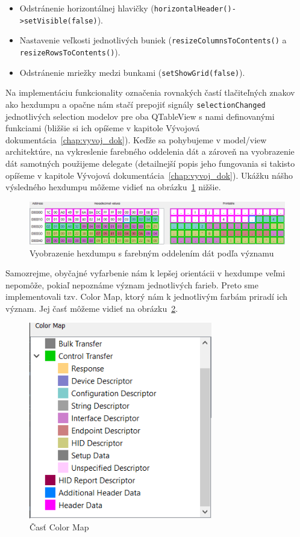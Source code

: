 \begin{itemize}
\item Odstránenie horizontálnej hlavičky (\texttt{horizontalHeader()->setVisible(false)}).
\item Nastavenie veľkosti jednotlivých buniek (\texttt{resizeColumnsToContents()} a \texttt{resizeRowsToContents()}).
\item Odstránenie mriežky medzi bunkami (\texttt{setShowGrid(false)}).
\end{itemize}

Na implementáciu funkcionality označenia rovnakých častí tlačiteľných znakov ako hexdumpu a opačne nám stačí prepojiť signály \texttt{selectionChanged} jednotlivých selection modelov pre oba QTableView s nami definovanými funkciami (bližšie si ich opíšeme v kapitole Vývojová dokumentácia~\ref{chap:vyvoj_dok}). Keďže sa pohybujeme v model/view architektúre, na vykreslenie farebného oddelenia dát a zároveň na vyobrazenie dát samotných použijeme delegate (detailnejší popis jeho fungovania si takisto opíšeme v kapitole Vývojová dokumentácia~\ref{chap:vyvoj_dok}). Ukážku nášho výsledného hexdumpu môžeme vidieť na obrázku~\ref{obr:kap3:hexdump_color} nižšie.

\begin{figure}[!htb]
	\centering
	\includegraphics[width=\textwidth]{img/kap03_hexdump_color}
	\caption{Vyobrazenie hexdumpu s farebným oddelením dát podľa významu}
	\label{obr:kap3:hexdump_color}
\end{figure}

Samozrejme, obyčajné vyfarbenie nám k lepšej orientácii v hexdumpe veľmi nepomôže, pokiaľ nepoznáme význam jednotlivých farieb. Preto sme implementovali tzv. Color Map, ktorý nám k jednotlivým farbám priradí ich význam. Jej časť môžeme vidieť na obrázku~\ref{obr:kap3:color_map}.

\begin{figure}[!htb]
	\centering
	\includegraphics[width=8cm]{img/kap03_colormap}
	\caption{Časť Color Map}
	\label{obr:kap3:color_map}
\end{figure}

